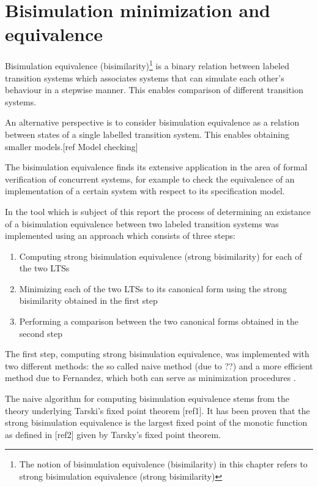 \section{Bisimulation minimization and equivalence}
Bisimulation equivalence (bisimilarity)\footnote{The notion of bisimulation equivalence (bisimilarity) in this chapter 
refers to strong bisimulation equivalence (strong bisimilarity)} is a binary relation between labeled transition systems 
which associates systems that can simulate each other's behaviour in a stepwise manner. This enables comparison of 
different transition systems.

An alternative perspective is to consider bisimulation equivalence as a relation between states of a single labelled 
transition system. This enables obtaining smaller models.[ref Model checking]

The bisimulation equivalence finds its extensive application in the area of formal verification of concurrent systems,
for example to check the equivalence of an implementation of a certain system with respect to its specification model.

In the tool which is subject of this report the process of determining an existance of a bisimulation equivalence 
between two labeled transition systems was implemented using an approach which consists of three steps:

\begin{enumerate}
\item Computing strong bisimulation equivalence (strong bisimilarity) for each of the two LTSs
\item Minimizing each of the two LTSs to its canonical form using the strong bisimilarity obtained
in the first step
\item Performing a comparison between the two canonical forms obtained in the second step
\end{enumerate}

The first step, computing strong bisimulation equivalence, was implemented with two different methods: the so called
naive method (due to ??) and a more efficient method due to Fernandez, which both can serve as minimization procedures
.

The naive algorithm for computing bisimulation equivalence stems from the theory underlying Tarski's fixed point
theorem [ref1]. It has been proven that the strong bisimulation equivalence is the largest fixed point of the 
monotic function  as defined in [ref2] given by Tarsky's fixed point theorem. 

